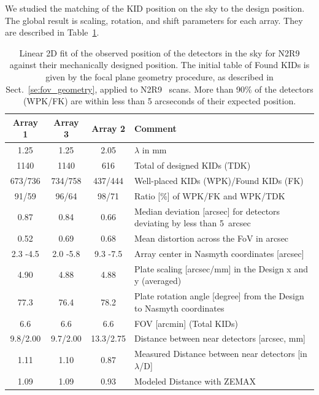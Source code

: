 We studied the matching of the KID position on the sky to the
design position. The global result is scaling, rotation, and shift
parameters for each array. They are described in Table~\ref{ta:gridmatch}.

\begin{table}[ht]
\label{ta:gridmatch}
\begin{center}
\begin{tabular}{|c|c|c|l|}
\hline
Array 1  &	Array 3   &	Array 2   &	Comment \\
\hline
1.25     &      1.25      &     2.05     &     \small{$\lambda$ in mm} \\
1140 	 &      1140 	   &        616  &     \small{Total of designed KIDs (TDK)} \\
673/736  &	734/758  &	437/444  &     \small{Well-placed KIDs (WPK)/Found KIDs (FK)} \\
91/59 	 &    96/64 	 &      98/71 	 & \small{Ratio [\%] of WPK/FK and WPK/TDK} \\
0.87 	 &     0.84 	  & 0.66     &	\small{Median deviation [arcsec] for detectors deviating by less than 5~arcsec} \\
0.52 	 &     0.69 	 &        0.68 	 & \small{Mean distortion across the FoV in arcsec} \\
2.3 -4.5  &	2.0 -5.8  &	9.3 -7.5  &	\small{Array center in Nasmyth coordinates [arcsec]} \\
4.90  &	4.88  &	4.88  &	\small{Plate scaling [arcsec/mm] in the Design x and y (averaged)} \\
77.3  &	76.4  &	78.2  &	\small{Plate rotation angle [degree] from the Design to Nasmyth coordinates} \\
6.6  &	6.6  &	6.6  &	\small{FOV [arcmin] (Total KIDs)} \\
9.8/2.00  &	9.7/2.00  &	13.3/2.75  &	\small{Distance between near detectors [arcsec, mm]} \\
1.11  &	1.10  &	0.87  &	\small{Measured Distance between near
  detectors [in $\lambda$/D] } \\
1.09  & 1.09  & 0.93  & \small{Modeled Distance with ZEMAX}\\
\hline
\end{tabular}
\end{center}
\caption[Field-of-view deformations]{Linear 2D fit of the observed
  position of the detectors in the sky for N2R9 against their mechanically
  designed position. The initial table of Found KIDs is given
  by the focal plane geometry procedure, as described in
  Sect.~\ref{se:fov_geometry},
  applied to N2R9 \bm\ scans. More than 90\% of the detectors (WPK/FK) are
  within less than 5 arcseconds of their expected position. }
\end{table}

